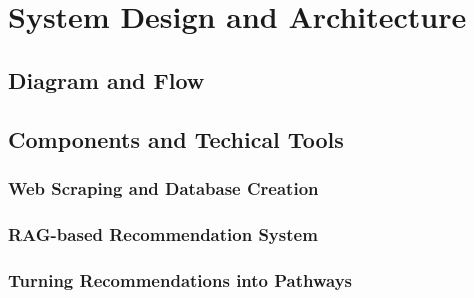 \chapter{System Design and Architecture} \label{chap:chap-4}




\section{Diagram and Flow}

\section{Components and Techical Tools}

\subsection{Web Scraping and Database Creation}

\subsection{RAG-based Recommendation System}

\subsection{Turning Recommendations into Pathways}



